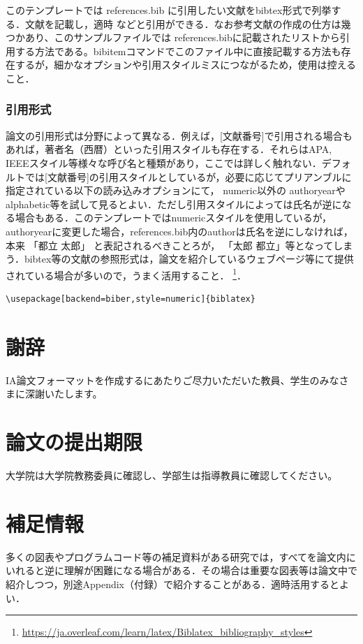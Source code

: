 \documentclass[uplatex,dvipdfmx,a4paper]{jsarticle}
\begin{document}
このテンプレートでは references.bib に引用したい文献をbibtex形式で列挙する．文献を記載し，適時 \cite{fujiwara}\cite{baba}\cite{weko_222242_1} などと引用ができる．なお参考文献の作成の仕方は幾つかあり、このサンプルファイルでは references.bibに記載されたリストから引用する方法である。bibitemコマンドでこのファイル中に直接記載する方法も存在するが，細かなオプションや引用スタイルミスにつながるため，使用は控えること．

\subsubsection{引用形式}
論文の引用形式は分野によって異なる．例えば，[文献番号]で引用される場合もあれば，著者名（西暦）といった引用スタイルも存在する．それらはAPA, IEEEスタイル等様々な呼び名と種類があり，ここでは詳しく触れない．デフォルトでは[文献番号]の引用スタイルとしているが，必要に応じてプリアンブルに指定されている以下の読み込みオプションにて， numeric以外の authoryearやalphabetic等を試して見るとよい．ただし引用スタイルによっては氏名が逆になる場合もある．このテンプレートではnumericスタイルを使用しているが，authoryearに変更した場合，references.bib内のauthorは氏名を逆にしなければ，本来 「都立 太郎」 と表記されるべきことろが， 「太郎 都立」等となってしまう．bibtex等の文献の参照形式は，論文を紹介しているウェブページ等にて提供されている場合が多いので，うまく活用すること．
 \footnote{\url{https://ja.overleaf.com/learn/latex/Biblatex_bibliography_styles}}．
\begin{verbatim}
\usepackage[backend=biber,style=numeric]{biblatex}    
\end{verbatim}



\renewcommand\refname{参考文献}
\printbibliography


\section*{謝辞}
IA論文フォーマットを作成するにあたりご尽力いただいた教員、学生のみなさまに深謝いたします。


\section*{論文の提出期限}
大学院は大学院教務委員に確認し、学部生は指導教員に確認してください。

\appendix
\section{補足情報}
多くの図表やプログラムコード等の補足資料がある研究では，すべてを論文内にいれると逆に理解が困難になる場合がある．その場合は重要な図表等は論文中で紹介しつつ，別途Appendix（付録）で紹介することがある．適時活用するとよい．
\end{document}
